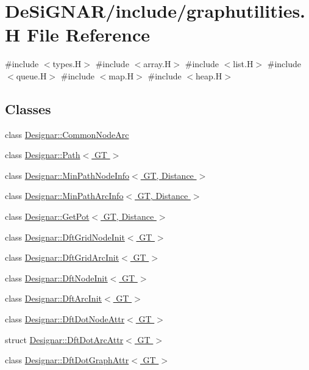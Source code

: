 \hypertarget{graphutilities_8_h}{}\section{De\+Si\+G\+N\+A\+R/include/graphutilities.H File Reference}
\label{graphutilities_8_h}
{\ttfamily \#include $<$types.\+H$>$}\newline
{\ttfamily \#include $<$array.\+H$>$}\newline
{\ttfamily \#include $<$list.\+H$>$}\newline
{\ttfamily \#include $<$queue.\+H$>$}\newline
{\ttfamily \#include $<$map.\+H$>$}\newline
{\ttfamily \#include $<$heap.\+H$>$}\newline
\subsection*{Classes}
\begin{DoxyCompactItemize}
\item 
class \hyperlink{class_designar_1_1_common_node_arc}{Designar\+::\+Common\+Node\+Arc}
\item 
class \hyperlink{class_designar_1_1_path}{Designar\+::\+Path$<$ G\+T $>$}
\item 
class \hyperlink{class_designar_1_1_min_path_node_info}{Designar\+::\+Min\+Path\+Node\+Info$<$ G\+T, Distance $>$}
\item 
class \hyperlink{class_designar_1_1_min_path_arc_info}{Designar\+::\+Min\+Path\+Arc\+Info$<$ G\+T, Distance $>$}
\item 
class \hyperlink{class_designar_1_1_get_pot}{Designar\+::\+Get\+Pot$<$ G\+T, Distance $>$}
\item 
class \hyperlink{class_designar_1_1_dft_grid_node_init}{Designar\+::\+Dft\+Grid\+Node\+Init$<$ G\+T $>$}
\item 
class \hyperlink{class_designar_1_1_dft_grid_arc_init}{Designar\+::\+Dft\+Grid\+Arc\+Init$<$ G\+T $>$}
\item 
class \hyperlink{class_designar_1_1_dft_node_init}{Designar\+::\+Dft\+Node\+Init$<$ G\+T $>$}
\item 
class \hyperlink{class_designar_1_1_dft_arc_init}{Designar\+::\+Dft\+Arc\+Init$<$ G\+T $>$}
\item 
class \hyperlink{class_designar_1_1_dft_dot_node_attr}{Designar\+::\+Dft\+Dot\+Node\+Attr$<$ G\+T $>$}
\item 
struct \hyperlink{struct_designar_1_1_dft_dot_arc_attr}{Designar\+::\+Dft\+Dot\+Arc\+Attr$<$ G\+T $>$}
\item 
class \hyperlink{class_designar_1_1_dft_dot_graph_attr}{Designar\+::\+Dft\+Dot\+Graph\+Attr$<$ G\+T $>$}
\end{DoxyCompactItemize}
